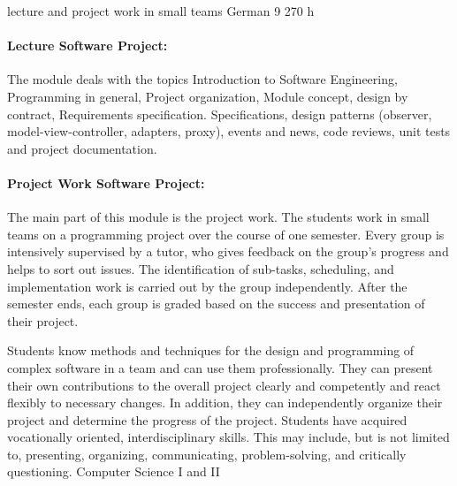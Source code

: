 {lecture and project work in small teams}
{German}
{9}
{270 h}
{\paragraph{Lecture Software Project: }The module deals with the topics Introduction to Software Engineering, Programming in general, Project organization, Module concept, design by contract, Requirements specification. Specifications, design patterns (observer, model-view-controller, adapters, proxy), events and news, code reviews, unit tests and project documentation.
\paragraph{Project Work Software Project: } The main part of this module is the project work. The students work in small teams on a programming project over the course of one semester. Every group is intensively supervised by a tutor, who gives feedback on the group's progress and helps to sort out issues. The identification of sub-tasks, scheduling, and implementation work is carried out by the group independently. After the semester ends, each group is graded based on the success and presentation of their project.} 
{Students know methods and techniques for the design and programming of complex software in a team and can use them professionally. They can present their own contributions to the overall project clearly and competently and react flexibly to necessary changes. In addition, they can independently organize their project and determine the progress of the project. Students have acquired vocationally oriented, interdisciplinary skills. This may include, but is not limited to, presenting, organizing, communicating, problem-solving, and critically questioning.}
{Computer Science I and II}